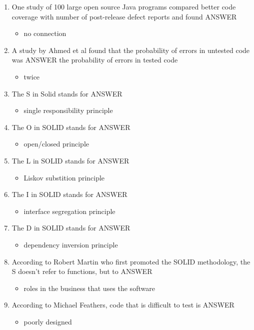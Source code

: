 \documentclass{exam}
\begin{document}
\begin{enumerate}
\item One study of 100 large open source Java programs compared better code coverage with number of post-release defect reports and found ANSWER
\begin{itemize}
\item no connection
\end{itemize}
\item A study by Ahmed et al found that the probability of errors in untested code was ANSWER the probability of errors in tested code
\begin{itemize}
\item twice
\end{itemize}
\item The S in Solid stands for ANSWER
\begin{itemize}
\item single responsibility principle
\end{itemize}
\item The O in SOLID stands for ANSWER
\begin{itemize}
\item open/closed principle
\end{itemize}
\item The L in SOLID stands for ANSWER
\begin{itemize}
\item Liskov substition principle
\end{itemize}
\item The I in SOLID stands for ANSWER
\begin{itemize}
\item interface segregation principle
\end{itemize}
\item The D in SOLID stands for ANSWER
\begin{itemize}
\item dependency inversion principle
\end{itemize}
\item According to Robert Martin who first promoted the SOLID methodology, the S doesn't refer to functions, but to ANSWER
\begin{itemize}
\item roles in the business that uses the software
\end{itemize}
\item According to Michael Feathers, code that is difficult to test is ANSWER
\begin{itemize}
\item poorly designed
\end{itemize}
\end{enumerate}
\end{document}
